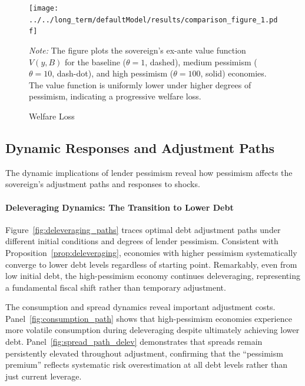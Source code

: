 \documentclass[12pt]{article}
\theoremstyle{plain}
\begin{document}
\begin{figure}[h!]
	\centering
	\texttt{[image: ../../long\_term/defaultModel/results/comparison\_figure\_1.pdf]}
	\caption{Welfare Loss}
	\label{fig:welfare_loss}
	\parbox{\linewidth}{\small\textit{Note:} The figure plots the sovereign's ex-ante value function $V(y, B)$ for the baseline ($\theta=1$, dashed), medium pessimism ($\theta=10$, dash-dot), and high pessimism ($\theta=100$, solid) economies. The value function is uniformly lower under higher degrees of pessimism, indicating a progressive welfare loss.}
\end{figure}

\subsection{Dynamic Responses and Adjustment Paths}

The dynamic implications of lender pessimism reveal how pessimism affects the
sovereign's adjustment paths and responses to shocks.

\paragraph{Deleveraging Dynamics: The Transition to Lower Debt}

Figure~\ref{fig:deleveraging_paths} traces optimal debt adjustment paths under
different initial conditions and degrees of lender pessimism. Consistent with
Proposition~\ref{prop:deleveraging}, economies with higher pessimism
systematically converge to lower debt levels regardless of starting point.
Remarkably, even from low initial debt, the high-pessimism economy continues
deleveraging, representing a fundamental fiscal shift rather than temporary
adjustment.

The consumption and spread dynamics reveal important adjustment costs.
Panel~\ref{fig:consumption_path} shows that high-pessimism economies experience
more volatile consumption during deleveraging despite ultimately achieving
lower debt. Panel~\ref{fig:spread_path_delev} demonstrates that spreads remain
persistently elevated throughout adjustment, confirming that the ``pessimism
premium'' reflects systematic risk overestimation at all debt levels rather
than just current leverage.
\end{document}
